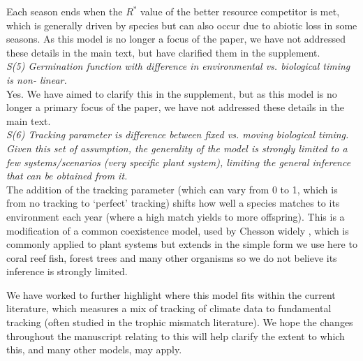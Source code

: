 \documentclass[11pt]{article}
\begin{document}
Each season ends when the $R^*$ value of the better resource competitor is met, which is generally driven by species but can also occur due to abiotic loss in some seasons. As this model is no longer a focus of the paper, we have not addressed these details in the main text, but have clarified them in the supplement.\\

\emph{S(5)     Germination function with difference in environmental vs. biological timing is non-
linear.}\\

Yes. We have aimed to clarify this in the supplement, but as this model is no longer a primary focus of the paper, we have not addressed these details in the main text.\\

\emph{S(6)     Tracking parameter is difference between fixed vs. moving biological timing.
Given this set of assumption, the generality of the model is strongly limited to a few
systems/scenarios (very specific plant system), limiting the general inference that can be
obtained from it.}\\

The addition of the tracking parameter (which can vary from 0 to 1, which is from no tracking to `perfect' tracking) shifts how well a species matches to its environment each year (where a high match yields to more offspring). This is a modification of a common coexistence model, used by Chesson widely \citep[][]{Chesson:2000vd,Chesson:2004eo}, which is commonly applied to plant systems but extends in the simple form we use here to coral reef fish, forest trees and many other organisms \citep[see][]{Chesson:1997dz} so we do not believe its inference is strongly limited.

We have worked to further highlight where this model fits within the current literature, which measures a mix of tracking of climate data to fundamental tracking (often studied in the trophic mismatch literature). We hope the changes throughout the manuscript relating to this will help clarify the extent to which this, and many other models, may apply.\\
\end{document}
